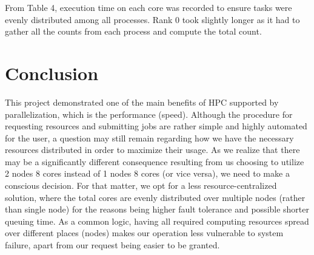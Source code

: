 \documentclass[11pt]{article}
\begin{document}
From Table 4, execution time on each core was recorded to ensure tasks were evenly distributed among all processes. Rank 0 took slightly longer as it had to gather all the counts from each process and compute the total count. 


\section{Conclusion}

This project demonstrated one of the main benefits of HPC supported by parallelization, which is the performance (speed). Although the procedure for requesting resources and submitting jobs are rather simple and highly automated for the user, a question may still remain regarding how we have the necessary resources distributed in order to maximize their usage. As we realize that there may be a significantly different consequence resulting from us choosing to utilize 2 nodes 8 cores instead of 1 nodes 8 cores (or vice versa), we need to make a conscious decision. For that matter, we opt for a less resource-centralized solution, where the total cores are evenly distributed over multiple nodes (rather than single node) for the reasons being higher fault tolerance and possible shorter queuing time. As a common logic, having all required computing resources spread over different places (nodes) makes our operation less vulnerable to system failure, apart from our request being easier to be granted.
\end{document}
